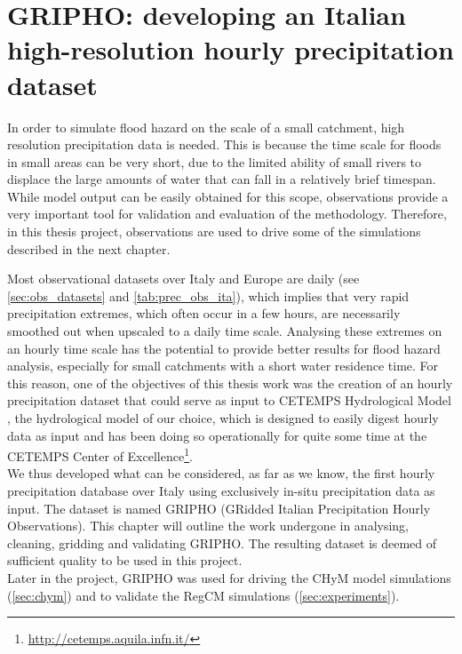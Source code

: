 \chapter{GRIPHO: developing an Italian high-resolution hourly precipitation dataset}\label{chp:itaobs}
In order to simulate flood hazard on the scale of a small catchment, high resolution precipitation data is needed. This is because the time scale for floods in small areas can be very short, due to the limited ability of small rivers to displace the large amounts of water that can fall in a relatively brief timespan.
While model output can be easily obtained for this scope, observations provide a very important tool for validation and evaluation of the methodology. Therefore, in this thesis project, observations are used to drive some of the simulations described in the next chapter.

Most observational datasets over Italy and Europe are daily (see \cref{sec:obs_datasets} and \cref{tab:prec_obs_ita}), which implies that very rapid precipitation extremes, which often occur in a few hours, are necessarily smoothed out when upscaled to a daily time scale.
Analysing these extremes on an hourly time scale has the potential to provide better results for flood hazard analysis, especially for small catchments with a short water residence time.
For this reason, one of the objectives of this thesis work was the creation of an hourly precipitation dataset that could serve as input to CETEMPS Hydrological Model \citep[CHyM,][, see \cref{sec:chym} for details]{Tomassetti2005,Coppola2006}, the hydrological model of our choice, which is designed to easily digest hourly data as input and has been doing so operationally for quite some time at the CETEMPS Center of Excellence\footnote{\url{http://cetemps.aquila.infn.it/}}.\\
We thus developed what can be considered, as far as we know, the first hourly precipitation database over Italy using exclusively in-situ precipitation data as input. The dataset is named GRIPHO (GRidded Italian Precipitation Hourly Observations).
This chapter will outline the work undergone in analysing, cleaning, gridding and validating GRIPHO. The resulting dataset is deemed of sufficient quality to be used in this project.\\
Later in the project, GRIPHO was used for driving the CHyM model simulations (\cref{sec:chym}) and to validate the RegCM simulations (\cref{sec:experiments}).


